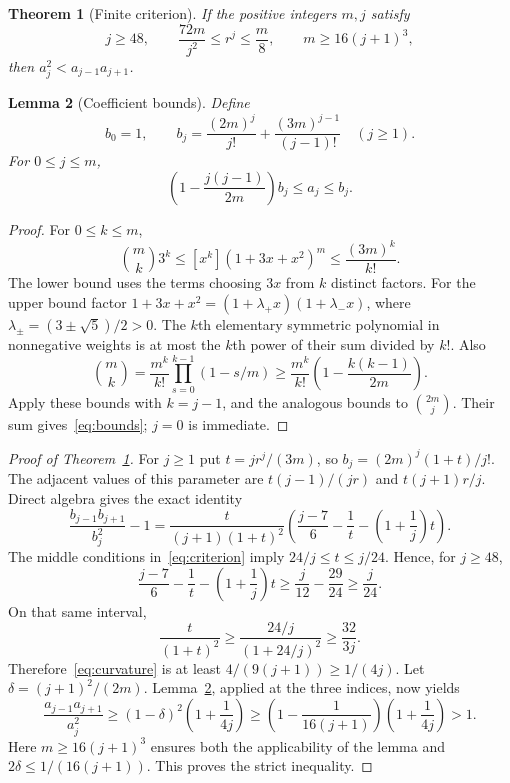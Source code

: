 \documentclass[11pt]{article}
\newtheorem{theorem}{Theorem}
\newtheorem{lemma}[theorem]{Lemma}
\newcommand{\coef}[2]{[x^{#1}]#2}
\begin{document}
\begin{theorem}[Finite criterion]\label{thm:finite}
If the positive integers $m,j$ satisfy
\begin{equation}\label{eq:criterion}
 j\ge48,\qquad
 \frac{72m}{j^2}\le r^j\le\frac m8,
 \qquad m\ge16(j+1)^3,
\end{equation}
then $a_j^2<a_{j-1}a_{j+1}$.
\end{theorem}

\begin{lemma}[Coefficient bounds]\label{lem:coeff}
Define
\[
 b_0=1,\qquad b_j=\frac{(2m)^j}{j!}
       +\frac{(3m)^{j-1}}{(j-1)!}\quad(j\ge1).
\]
For $0\le j\le m$,
\begin{equation}\label{eq:bounds}
 \left(1-\frac{j(j-1)}{2m}\right)b_j\le a_j\le b_j.
\end{equation}
\end{lemma}
\begin{proof}
For $0\le k\le m$,
\[
 \binom mk3^k\le\coef{k}{(1+3x+x^2)^m}
                 \le\frac{(3m)^k}{k!}.
\]
The lower bound uses the terms choosing $3x$ from $k$ distinct factors. For the upper bound factor $1+3x+x^2=(1+\lambda_+x)(1+\lambda_-x)$, where $\lambda_\pm=(3\pm\sqrt5)/2>0$. The $k$th elementary symmetric polynomial in nonnegative weights is at most the $k$th power of their sum divided by $k!$. Also
\[
 \binom mk=\frac{m^k}{k!}\prod_{s=0}^{k-1}(1-s/m)
 \ge\frac{m^k}{k!}\left(1-\frac{k(k-1)}{2m}\right).
\]
Apply these bounds with $k=j-1$, and the analogous bounds to
$\binom{2m}{j}$. Their sum gives~\eqref{eq:bounds}; $j=0$ is immediate.
\end{proof}

\begin{proof}[Proof of Theorem~\ref{thm:finite}]
For $j\ge1$ put $t=j r^j/(3m)$, so $b_j=(2m)^j(1+t)/j!$.
The adjacent values of this parameter are $t(j-1)/(jr)$ and
$t(j+1)r/j$. Direct algebra gives the exact identity
\begin{equation}\label{eq:curvature}
 \frac{b_{j-1}b_{j+1}}{b_j^2}-1
 =\frac{t}{(j+1)(1+t)^2}
 \left(\frac{j-7}{6}-\frac1t-\left(1+\frac1j\right)t\right).
\end{equation}
The middle conditions in~\eqref{eq:criterion} imply
$24/j\le t\le j/24$. Hence, for $j\ge48$,
\[
 \frac{j-7}{6}-\frac1t-\left(1+\frac1j\right)t
 \ge\frac{j}{12}-\frac{29}{24}\ge\frac j{24}.
\]
On that same interval,
\[
 \frac{t}{(1+t)^2}\ge
 \frac{24/j}{(1+24/j)^2}\ge\frac{32}{3j}.
\]
Therefore~\eqref{eq:curvature} is at least $4/(9(j+1))\ge1/(4j)$.
Let $\delta=(j+1)^2/(2m)$. Lemma~\ref{lem:coeff}, applied at the three
indices, now yields
\[
 \frac{a_{j-1}a_{j+1}}{a_j^2}
 \ge(1-\delta)^2\left(1+\frac1{4j}\right)
 \ge\left(1-\frac1{16(j+1)}\right)
       \left(1+\frac1{4j}\right)>1.
\]
Here $m\ge16(j+1)^3$ ensures both the applicability of the lemma and
$2\delta\le1/(16(j+1))$. This proves the strict inequality.
\end{proof}
\end{document}
